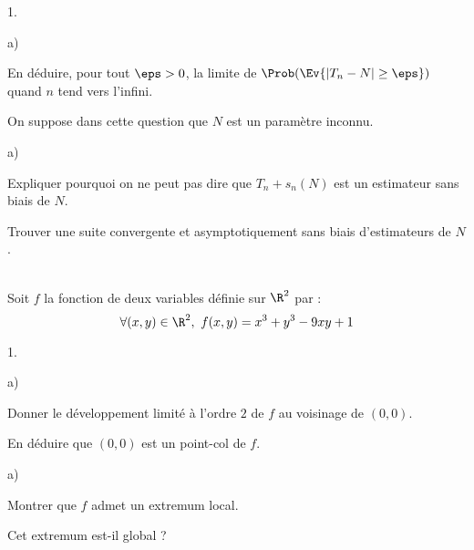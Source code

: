 \documentclass[11pt]{article}%
\begin{document}
\begin{exerciceAP}
\begin{noliste}{1.}
\begin{noliste}{a)}
      \item En déduire, pour tout $\eps>0$, la limite de 
      $\Prob(\Ev{\vert T_n - N \vert \geq \eps})$ quand $n$ tend 
      vers l'infini.
    \end{noliste}
    
    \item On suppose dans cette question que $N$ est un paramètre 
    inconnu.
    \begin{noliste}{a)}
    \setlength{\itemsep}{2mm}
      \item Expliquer pourquoi on ne peut pas dire que $T_n + s_n(N)$
      est un estimateur sans biais de $N$.
      
      \item Trouver une suite convergente et asymptotiquement sans 
      biais d'estimateurs de $N$.
    \end{noliste}
  \end{noliste}
\end{exerciceAP}


\begin{exerciceSP}~\\
  Soit $f$ la fonction de deux variables définie sur $\R^2$ par :
  \[
    \forall (x,y) \in \R^2, \ f(x,y) = x^3 + y^3 - 9xy +1
  \]
  \begin{noliste}{1.}
    \setlength{\itemsep}{2mm}
    \item 
    \begin{noliste}{a)}
    \setlength{\itemsep}{2mm}
      \item Donner le développement limité à l'ordre $2$ de $f$ 
      au voisinage de $(0,0)$.
      
      \item En déduire que $(0,0)$ est un point-col de $f$.
    \end{noliste}
    
    \item 
    \begin{noliste}{a)}
    \setlength{\itemsep}{2mm}
      \item Montrer que $f$ admet un extremum local.
      
      \item Cet extremum est-il global ?
    \end{noliste}
  \end{noliste}
\end{exerciceSP}
\end{document}
